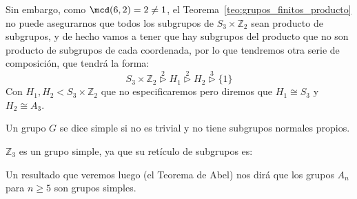 \begin{ejemplo}
\begin{itemize}
            Sin embargo, como $\mcd(6,2) = 2 \neq 1$, el Teorema~\ref{teo:grupos_finitos_producto} no puede asegurarnos que todos los subgrupos de $S_3\times \mathbb{Z}_2$ sean producto de subgrupos, y de hecho vamos a tener que hay subgrupos del producto que no son producto de subgrupos de cada coordenada, por lo que tendremos otra serie de composición, que tendrá la forma:
            \begin{equation*}
                S_3\times \mathbb{Z}_2 \stackrel{2}{\rhd} H_1 \stackrel{2}{\rhd} H_2 \stackrel{3}{\rhd} \{1\}
            \end{equation*}
            Con $H_1,H_2 < S_3\times \mathbb{Z}_2$ que no especificaremos pero diremos que $H_1\cong S_3$ y $H_2\cong A_3$.
    \end{itemize}
\end{ejemplo}

\begin{definicion}
    Un grupo $G$ se dice simple si no es trivial y no tiene subgrupos normales propios.
\end{definicion}

\begin{ejemplo}
    $\mathbb{Z}_3$ es un grupo simple, ya que su retículo de subgrupos es:
    \begin{figure}[H]
        \centering
    \end{figure}
    \noindent
    Un resultado que veremos luego (el Teorema de Abel) nos dirá que los grupos $A_n$ para $n\geq 5$ son grupos simples.
\end{ejemplo}

\newpage
